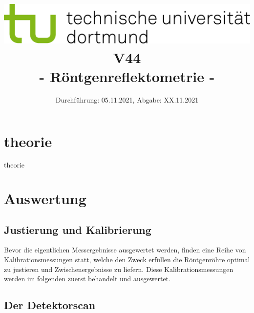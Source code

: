 
\usepackage{romannum}

\title{\includegraphics[scale=0.8]{../logo.jpg} \\ \vspace*{1cm} V44 \\ - Röntgenreflektometrie -}

\date{Durchführung: 05.11.2021, Abgabe: XX.11.2021}



\maketitle

\tableofcontents
\newpage


\section{theorie}

theorie\cite{anleitung}

\section{Auswertung}
\subsection{Justierung und Kalibrierung}
Bevor die eigentlichen Messergebnisse ausgewertet werden, finden eine Reihe von Kalibrationsmessungen statt,
welche den Zweck erfüllen die Röntgenröhre optimal zu justieren und Zwischenergebnisse zu liefern.
Diese Kalibrationsmessungen werden im folgenden zuerst behandelt und ausgewertet.

\subsection{Der Detektorscan}


